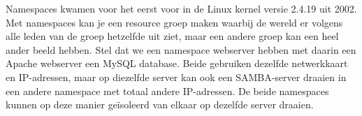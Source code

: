 Namespaces kwamen voor het eerst voor in de Linux kernel versie 2.4.19 uit 2002. Met namespaces kan je een resource groep maken waarbij de wereld er volgens alle leden van de groep hetzelfde uit ziet, maar een andere groep kan een heel ander beeld hebben.
Stel dat we een namespace webserver hebben met daarin een Apache webserver een MySQL database. Beide gebruiken dezelfde netwerkkaart en IP-adressen, maar op diezelfde server kan ook een SAMBA-server draaien in een andere namespace met totaal andere IP-adressen. De beide namespaces kunnen op deze manier ge\"isoleerd van elkaar op dezelfde server draaien.
